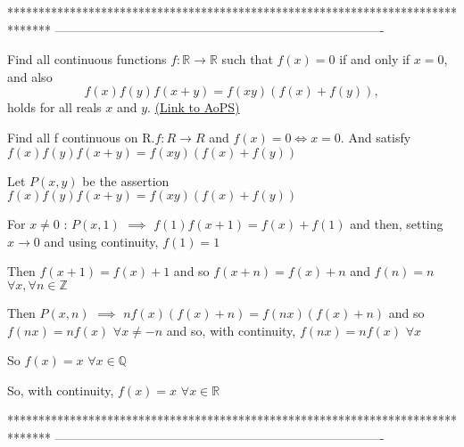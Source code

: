 *******************************************************************************
-------------------------------------------------------------------------------

\begin{problem}
	Find all continuous functions $ f: \mathbb R \to \mathbb R$ such that $ f(x)=0$ if and only if $x=0$, and also 
\[f(x)f(y)f(x+y)=f(xy)(f(x)+f(y)),\]
holds for all reals $x$ and $y$.
	\flushright \href{https://artofproblemsolving.com/community/c6h305836}{(Link to AoPS)}
\end{problem}



\begin{solution}
	\begin{tcolorbox}Find all f continuous on R.$ f: R\to R$ and $ f(x) = 0\Leftrightarrow x = 0$. And satisfy $ f(x)f(y)f(x + y) = f(xy)(f(x) + f(y))$\end{tcolorbox}

Let $ P(x,y)$ be the assertion $ f(x)f(y)f(x+y)=f(xy)(f(x)+f(y))$

For $ x\neq 0$ : $ P(x,1)$ $ \implies$ $ f(1)f(x+1)=f(x)+f(1)$ and then, setting $ x\to 0$ and using continuity, $ f(1)=1$

Then $ f(x+1)=f(x)+1$ and so $ f(x+n)=f(x)+n$ and $ f(n)=n$ $ \forall x,\forall n\in\mathbb Z$

Then $ P(x,n)$ $ \implies$ $ nf(x)(f(x)+n)=f(nx)(f(x)+n)$ and so $ f(nx)=nf(x)$ $ \forall x\neq -n$ and so, with continuity, $ f(nx)=nf(x)$ $ \forall x$

So $ f(x)=x$ $ \forall x\in\mathbb Q$

So, with continuity, $ f(x)=x$ $ \forall x\in\mathbb R$
\end{solution}
*******************************************************************************
-------------------------------------------------------------------------------

